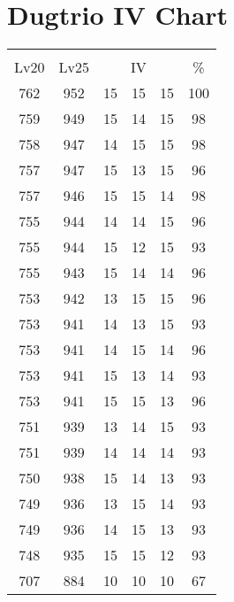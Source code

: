 \documentclass{article}%
\begin{document}
%
\normalsize%
\section{Dugtrio IV Chart}%
\label{sec:Dugtrio IV Chart}%
\renewcommand{\arraystretch}{1.5}%
\begin{tabular}{|c|c|c|c|c|c|}%
\hline%
\multicolumn{6}{|c|}{\textcolor{white}{ 
\linebreak{Dugtrio}
}%
\cellcolor{black}}\\%
\multicolumn{1}{|c}{Lv20}&\multicolumn{1}{c|}{Lv25}&\multicolumn{3}{c|}{IV}&\multicolumn{1}{|c|}{\%}\\%
\hline%
\rowcolor{color100}%
762&952&15&15&15&100\\%
\hline%
\rowcolor{color98}%
759&949&15&14&15&98\\%
\hline%
\rowcolor{color98}%
758&947&14&15&15&98\\%
\hline%
\rowcolor{color96}%
757&947&15&13&15&96\\%
\hline%
\rowcolor{color98}%
757&946&15&15&14&98\\%
\hline%
\rowcolor{color96}%
755&944&14&14&15&96\\%
\hline%
\rowcolor{color93}%
755&944&15&12&15&93\\%
\hline%
\rowcolor{color96}%
755&943&15&14&14&96\\%
\hline%
\rowcolor{color96}%
753&942&13&15&15&96\\%
\hline%
\rowcolor{color93}%
753&941&14&13&15&93\\%
\hline%
\rowcolor{color96}%
753&941&14&15&14&96\\%
\hline%
\rowcolor{color93}%
753&941&15&13&14&93\\%
\hline%
\rowcolor{color96}%
753&941&15&15&13&96\\%
\hline%
\rowcolor{color93}%
751&939&13&14&15&93\\%
\hline%
\rowcolor{color93}%
751&939&14&14&14&93\\%
\hline%
\rowcolor{color93}%
750&938&15&14&13&93\\%
\hline%
\rowcolor{color93}%
749&936&13&15&14&93\\%
\hline%
\rowcolor{color93}%
749&936&14&15&13&93\\%
\hline%
\rowcolor{color93}%
748&935&15&15&12&93\\%
\hline%
\rowcolor{color91}%
707&884&10&10&10&67\\%
\end{tabular}

%
\end{document}

